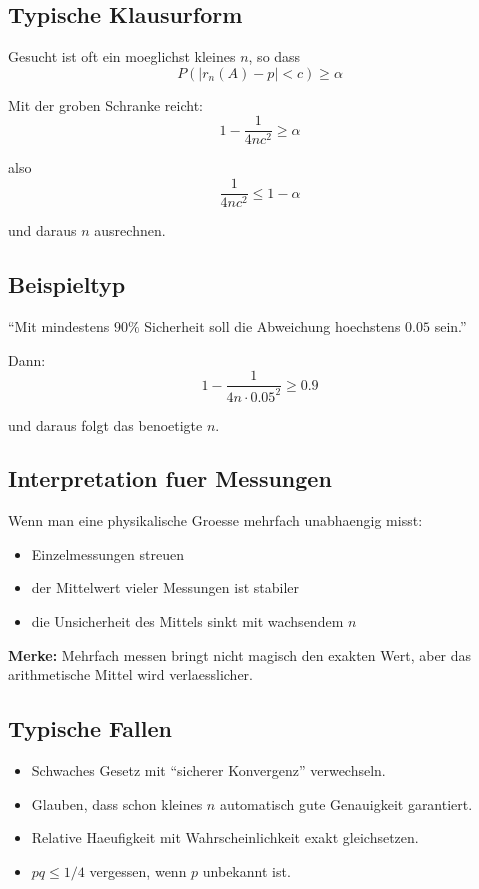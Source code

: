 \documentclass[a4paper,11pt]{article}
\begin{document}
\subsection{Typische Klausurform}
Gesucht ist oft ein moeglichst kleines $n$, so dass
\[
P(|r_n(A)-p|<c)\ge \alpha
\]

Mit der groben Schranke reicht:
\[
1-\frac{1}{4nc^2}\ge \alpha
\]

also
\[
\frac{1}{4nc^2}\le 1-\alpha
\]

und daraus $n$ ausrechnen.

\subsection{Beispieltyp}
``Mit mindestens $90\%$ Sicherheit soll die Abweichung hoechstens $0.05$ sein.''

Dann:
\[
1-\frac{1}{4n\cdot 0.05^2}\ge 0.9
\]

und daraus folgt das benoetigte $n$.

\subsection{Interpretation fuer Messungen}
Wenn man eine physikalische Groesse mehrfach unabhaengig misst:
\begin{itemize}
  \item Einzelmessungen streuen
  \item der Mittelwert vieler Messungen ist stabiler
  \item die Unsicherheit des Mittels sinkt mit wachsendem $n$
\end{itemize}

\textbf{Merke:}
Mehrfach messen bringt nicht magisch den exakten Wert, aber das arithmetische Mittel wird verlaesslicher.

\subsection{Typische Fallen}
\begin{itemize}
  \item Schwaches Gesetz mit ``sicherer Konvergenz'' verwechseln.
  \item Glauben, dass schon kleines $n$ automatisch gute Genauigkeit garantiert.
  \item Relative Haeufigkeit mit Wahrscheinlichkeit exakt gleichsetzen.
  \item $pq\le 1/4$ vergessen, wenn $p$ unbekannt ist.
\end{itemize}
\end{document}
